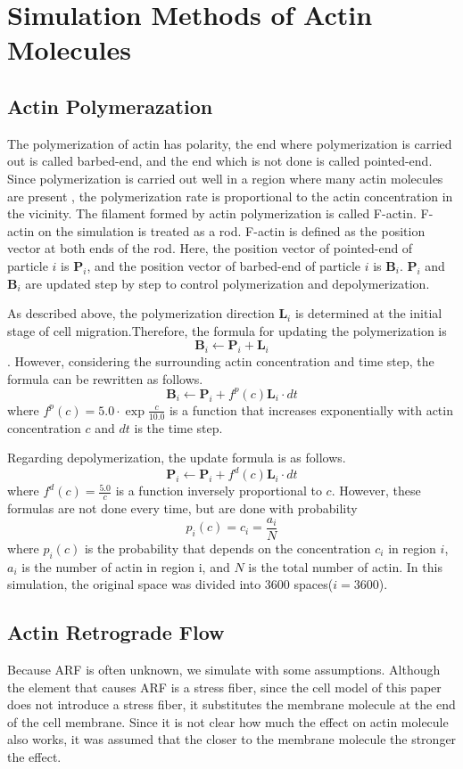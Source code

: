 \documentclass[a4paper,12pt]{book}
\begin{document}
\section{Simulation Methods of Actin Molecules}
\subsection{Actin Polymerazation}
The polymerization of actin has polarity, the end where polymerization is carried out is called barbed-end, and the end which is not done is called pointed-end. Since polymerization is carried out well in a region where many actin molecules are present , the polymerization rate is proportional to the actin concentration in the vicinity.  The filament formed by actin polymerization is called F-actin. F-actin on the simulation is treated as a rod. F-actin is defined as the position vector at both ends of the rod.
Here, the position vector of pointed-end of particle $i$ is $\bm{P}_i$, and the position vector of barbed-end of particle $i$ is $\bm{B}_i$.
$\bm{P}_i$ and $\bm{B}_i$ are updated step by step to control polymerization and depolymerization.

As described above, the polymerization direction $\bm{L}_i$ is determined at the initial stage of cell migration.Therefore, the formula for updating the polymerization is \[\bm{B}_i \gets \bm{P}_i + \bm{L}_i\]. However, considering the surrounding actin concentration and time step, the formula can be rewritten as follows.
\begin{equation}
\bm{B}_i \gets \bm{P}_i + f^p(c)\bm{L}_i \cdot dt
\end{equation}
where $f^p(c) = 5.0 \cdot \exp{\frac{c}{10.0}}$ is a function that  increases exponentially with actin concentration $c$ and $dt$ is the time step.

Regarding depolymerization, the update formula is as follows.
\begin{equation}
\bm{P}_i \gets \bm{P}_i + f^d(c)\bm{L}_i \cdot dt
\end{equation}
where  $f^d(c) = \frac{5.0}{c}$ is a function inversely proportional to $c$. However, these formulas are not done every time, but are done with probability \[p_i(c) = c_i = \frac{a_i}{N}\] where $p_i(c)$ is the probability that depends on the concentration $c_i$ in region $i$, $a_i$ is the number of actin in region i, and $N$ is the total number of actin. In this simulation, the original space was divided into 3600 spaces($i=3600$).


\subsection{Actin Retrograde Flow}
Because ARF is often unknown, we simulate with some assumptions. Although the element that causes ARF is a stress fiber, since the cell model of this paper does not introduce a stress fiber, it substitutes the membrane molecule at the end of the cell membrane. Since it is not clear how much the effect on actin molecule also works, it was assumed that the closer to the membrane molecule the stronger the effect.
\end{document}
